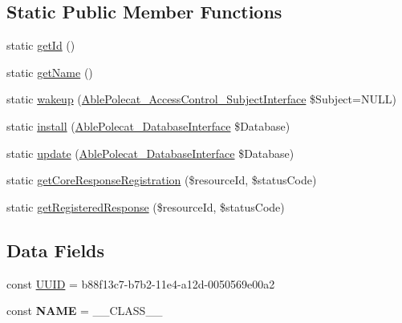 \subsection*{Static Public Member Functions}
\begin{DoxyCompactItemize}
\item 
static \hyperlink{class_able_polecat___registry___response_acfaa3a96d0cb5a4c0d4d710dcba41e9e}{get\+Id} ()
\item 
static \hyperlink{class_able_polecat___registry___response_a4ef9bd37ba3ce8a13c1e8bcf4f72a630}{get\+Name} ()
\item 
static \hyperlink{class_able_polecat___registry___response_a3f2135f6ad45f51d075657f6d20db2cd}{wakeup} (\hyperlink{interface_able_polecat___access_control___subject_interface}{Able\+Polecat\+\_\+\+Access\+Control\+\_\+\+Subject\+Interface} \$Subject=N\+U\+L\+L)
\item 
static \hyperlink{class_able_polecat___registry___response_a97e9bacf538c072e0542eeb96d2475af}{install} (\hyperlink{interface_able_polecat___database_interface}{Able\+Polecat\+\_\+\+Database\+Interface} \$Database)
\item 
static \hyperlink{class_able_polecat___registry___response_a8398510e79e9787266fe116d6431948c}{update} (\hyperlink{interface_able_polecat___database_interface}{Able\+Polecat\+\_\+\+Database\+Interface} \$Database)
\item 
static \hyperlink{class_able_polecat___registry___response_a6b2ac4dc1e570f1e4eaf4fa65498e07e}{get\+Core\+Response\+Registration} (\$resource\+Id, \$status\+Code)
\item 
static \hyperlink{class_able_polecat___registry___response_a5cf62eaf5ec43ef07957ee021d2038a4}{get\+Registered\+Response} (\$resource\+Id, \$status\+Code)
\end{DoxyCompactItemize}
\subsection*{Data Fields}
\begin{DoxyCompactItemize}
\item 
const \hyperlink{class_able_polecat___registry___response_a74b892c8c0b86bf9d04c5819898c51e7}{U\+U\+I\+D} = \textquotesingle{}b88f13c7-\/b7b2-\/11e4-\/a12d-\/0050569e00a2\textquotesingle{}
\item 
\hypertarget{class_able_polecat___registry___response_a244352f035b82b20b0efa506167fd862}{}const {\bfseries N\+A\+M\+E} = \+\_\+\+\_\+\+C\+L\+A\+S\+S\+\_\+\+\_\+\label{class_able_polecat___registry___response_a244352f035b82b20b0efa506167fd862}

\end{DoxyCompactItemize}

